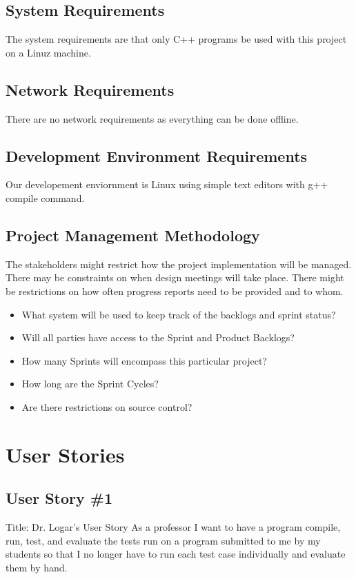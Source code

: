 \subsection{System  Requirements}
The system requirements are that only C++ programs be used with this project on a Linuz machine.


\subsection{Network Requirements}
There are no network requirements as everything can be done offline.


\subsection{Development Environment Requirements}
Our developement enviornment is Linux using simple text editors with g++ compile command.


\subsection{Project  Management Methodology}
The stakeholders might restrict how the project implementation will be managed. 
 There may be constraints on when design meetings will take place.  There might 
be restrictions on how often progress reports need to be provided and to whom. 
 
\begin{itemize}
\item What system will be used to keep track of the backlogs and sprint status?
\item Will all parties have access to the Sprint and Product Backlogs?
\item How many Sprints will encompass this particular project?
\item How long are the Sprint Cycles?
\item Are there restrictions on source control? 
\end{itemize}

\section{User Stories}




\subsection{User Story \#1}
 Title: Dr. Logar's User Story
As a professor I want to have a program compile, run, test, and evaluate the tests run on a program submitted to me by 
my students so that I no longer have to run each test case individually and evaluate them by hand. 

